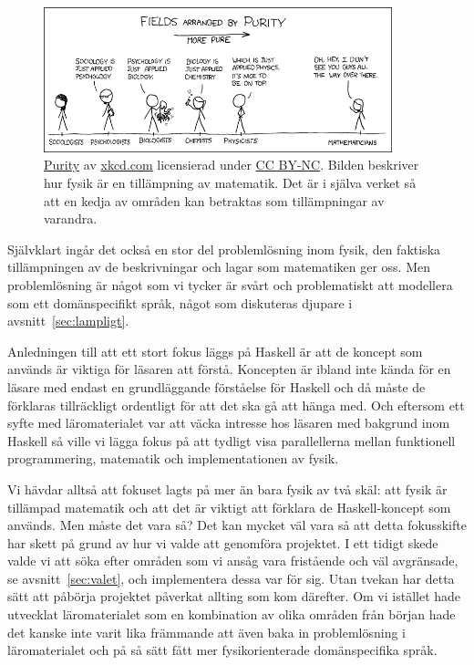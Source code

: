 \begin{figure}[tph]
  \centering
  \includegraphics[width=0.9\textwidth]{figure/purity.png}
  \caption{\href{https://xkcd.com/435/}{Purity} av
  \href{https://xkcd.com}{xkcd.com} licensierad under
\href{https://creativecommons.org/licenses/by-nc/2.5/}{CC BY-NC}. Bilden beskriver hur fysik är en tillämpning av matematik. Det är i själva verket
så att en kedja av områden kan betraktas som tillämpningar av
varandra.}\label{fig:xkcd}
\end{figure}

Självklart ingår det också en stor del problemlösning inom fysik, den faktiska
tillämpningen av de beskrivningar och lagar som matematiken ger oss. Men
problemlösning är något som vi tycker är svårt och problematiskt att modellera
som ett domänspecifikt språk, något som diskuteras djupare i
avsnitt~\ref{sec:lampligt}.

Anledningen till att ett stort fokus läggs på Haskell är att de koncept som används är viktiga för läsaren att förstå. Koncepten är ibland inte kända för en läsare med endast en grundläggande förståelse för Haskell och då måste de förklaras tillräckligt ordentligt för att det ska gå att hänga med. Och
eftersom ett syfte med läromaterialet var att väcka intresse hos läsaren med
bakgrund inom Haskell så ville vi lägga fokus på att tydligt visa
parallellerna mellan funktionell programmering, matematik och implementationen
av fysik.

Vi hävdar alltså att fokuset lagts på mer än bara fysik av två skäl: att fysik är tillämpad matematik och att det är viktigt att förklara de Haskell-koncept som används. Men måste
det vara så? Det kan mycket väl vara så att detta fokusskifte har skett på grund
av hur vi valde att genomföra projektet. I ett tidigt skede valde vi att söka efter
områden som vi ansåg vara fristående och väl avgränsade, se avsnitt~\ref{sec:valet},
och implementera dessa var för sig. Utan tvekan har detta sätt att påbörja
projektet påverkat allting som kom därefter. Om vi istället hade utvecklat
läromaterialet som en kombination av olika områden från början hade det kanske
inte varit lika främmande att även baka in problemlösning i läromaterialet och på så sätt
fått mer fysikorienterade domänspecifika språk.

